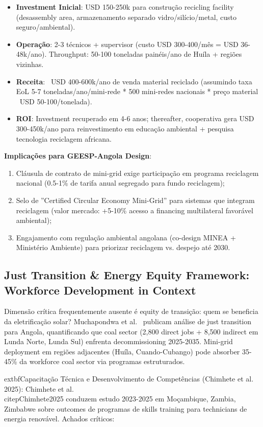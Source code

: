 \documentclass[12pt, a4paper]{article}
\begin{document}
{{{{{{{{{{{\begin{itemize}
\item \textbf{Investment Inicial}: USD 150-250k para construção recicling facility (desassembly area, armazenamento separado vidro/silício/metal, custo seguro/ambiental).
\item \textbf{Operação}: 2-3 técnicos + supervisor (custo USD 300-400/mês = USD 36-48k/ano). Throughput: 50-100 toneladas painéis/ano de Huíla + regiões vizinhas.
\item \textbf{Receita}: ~USD 400-600k/ano de venda material reciclado (assumindo taxa EoL 5-7 toneladas/ano/mini-rede * 500 mini-redes nacionais * preço material ~USD 50-100/tonelada).
\item \textbf{ROI}: Investment recuperado em 4-6 anos; thereafter, cooperativa gera USD 300-450k/ano para reinvestimento em educação ambiental + pesquisa tecnologia reciclagem africana.
\end{itemize}

\textbf{Implicações para GEESP-Angola Design}:
\begin{enumerate}
\item Cláusula de contrato de mini-grid exige participação em programa reciclagem nacional (0.5-1\% de tarifa anual segregado para fundo reciclagem);
\item Selo de ''Certified Circular Economy Mini-Grid'' para sistemas que integram reciclagem (valor mercado: +5-10\% acesso a financing multilateral favorável ambiental);
\item Engajamento com regulação ambiental angolana (co-design MINEA + Ministério Ambiente) para priorizar reciclagem vs. despejo até 2030.
\end{enumerate}

\subsection{Just Transition & Energy Equity Framework: Workforce Development in Context}

Dimensão crítica frequentemente ausente é equity de transição: quem se beneficia da eletrificação solar? Muchapondwa et al.~\citep{Muchapondwa2024} publicam análise de just transition para Angola, quantificando que coal sector (2,800 direct jobs + 8,500 indirect em Lunda Norte, Lunda Sul) enfrenta decommissioning 2025-2035. Mini-grid deployment em regiões adjacentes (Huíla, Cuando-Cubango) pode absorber 35-45\% da workforce coal sector via programas estruturados.

	extbf{Capacitação Técnica e Desenvolvimento de Competências (Chimhete et al. 2025)}: Chimhete et al.~\\citep{Chimhete2025} conduzem estudo 2023-2025 em Moçambique, Zambia, Zimbabwe sobre outcomes de programas de skills training para technicians de energia renovável. Achados críticos:

}}}}}}}}}}}
\end{document}
